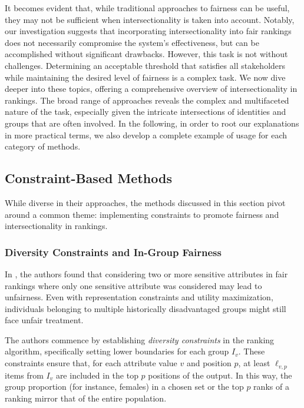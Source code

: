 It becomes evident that, while traditional approaches to fairness can be useful, they may not be sufficient when intersectionality is taken into account. Notably, our investigation suggests that incorporating intersectionality into fair rankings does not necessarily compromise the system's effectiveness, but can be accomplished without significant drawbacks.
%
However, this task is not without challenges. Determining an acceptable threshold that satisfies all stakeholders while maintaining the desired level of fairness is a complex task. We now dive deeper into these topics, offering a comprehensive overview of intersectionality in rankings. The broad range of approaches reveals the complex and multifaceted nature of the task, especially given the intricate intersections of identities and groups that are often involved.
%
In the following, in order to root our explanations in more practical terms, we also develop a complete example of usage for each category of methods.


\subsection{Constraint-Based Methods} 
\label{subsec:intrank_meth_constr}

While diverse in their approaches, the methods discussed in this section pivot around a common theme: implementing constraints to promote fairness and intersectionality in rankings.

\subsubsection{Diversity Constraints and In-Group Fairness}
\label{subsec:intrank_meth_constr_9n}


In \cite{yang2019balanced}, the authors found that considering two or more sensitive attributes in fair rankings where only one sensitive attribute was considered may lead to unfairness.
Even with representation constraints and utility maximization, individuals belonging to multiple historically disadvantaged groups might still face unfair treatment. 

The authors commence by establishing \emph{diversity constraints} in the ranking algorithm, specifically setting lower boundaries for each group $I_v$. 
These constraints 
 ensure that, for each attribute value $v$ and position $p$, at least $\ell_{v, p}$ items from $I_v$ are included in the top $p$ positions of the output. In this way, the group proportion (for instance, females) in a chosen set or the top $p$ ranks of a ranking mirror that of the entire population.

